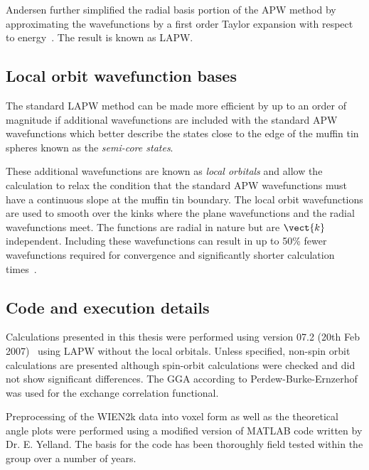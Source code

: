 Andersen further simplified the radial basis portion of the \ac{APW} method by approximating the wavefunctions by a first order Taylor expansion with respect to energy~\cite{Andersen1975}. The result is known as \ac{LAPW}.

\subsection{Local orbit wavefunction bases}

The standard \ac{LAPW} method can be made more efficient by up to an order of magnitude if additional wavefunctions are included with the standard \ac{APW} wavefunctions which better describe the states close to the edge of the muffin tin spheres known as the \emph{semi-core states}.

These additional wavefunctions are known as \emph{local orbitals} and allow the calculation to relax the condition that the standard \ac{APW} wavefunctions must have a continuous slope at the muffin tin boundary. The local orbit wavefunctions are used to smooth over the kinks where the plane wavefunctions and the radial wavefunctions meet. The functions are radial in nature but are $\vect{k}$ independent. Including these wavefunctions can result in up to \unit{50}{\%} fewer wavefunctions required for convergence and significantly shorter calculation times~\cite{Madsen2001}.

\subsection{Code and execution details}

Calculations presented in this thesis were performed using \WIEN version 07.2 (20th Feb 2007)~\cite{Blaha2001} using \ac{LAPW} without the local orbitals. Unless specified, non-spin orbit calculations are presented although spin-orbit calculations were checked and did not show significant differences. The \ac{GGA} according to Perdew-Burke-Ernzerhof~\cite{Perdew1996} was used for the exchange correlation functional.

Preprocessing of the WIEN2k data into voxel form as well as the theoretical angle plots were performed using a modified version of MATLAB code written by Dr. E. Yelland. The basis for the code has been thoroughly field tested within the group over a number of years.

